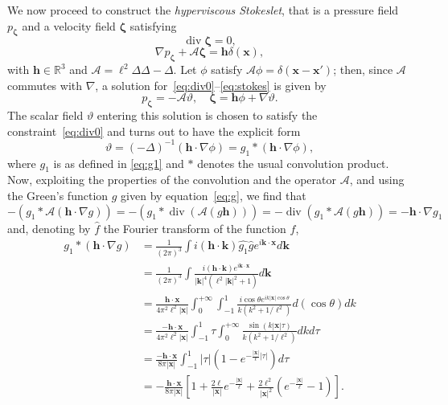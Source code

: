 \documentclass[final]{amsart}
\theoremstyle{definition}
\theoremstyle{definition}
\theoremstyle{remark}
\begin{document}
We now proceed to construct the {\em hyperviscous Stokeslet}, that is a
pressure field ${p_{\boldsymbol{\zeta}}}$ and a velocity field ${\boldsymbol{\zeta}}$ satisfying
\begin{equation}\label{eq:div0}
{\operatorname{\mathrm{div}}}{\boldsymbol{\zeta}}=0,
\end{equation}
\begin{equation}\label{eq:stokes}
\nabla{p_{\boldsymbol{\zeta}}}+\mathcal A{\boldsymbol{\zeta}} ={\boldsymbol h}\delta({\boldsymbol x}),
\end{equation}
with ${\boldsymbol h}\in{\mathbb R}^3$ and $\mathcal A=\ell^2{\Delta}{\Delta} - {\Delta}$.
Let $\phi$ satisfy $\mathcal A\phi=\delta({\boldsymbol x}-{\boldsymbol x}')$; then, since
$\mathcal A$ commutes with $\nabla$, a solution
for~\eqref{eq:div0}--\eqref{eq:stokes} is given by
\[
{p_{\boldsymbol{\zeta}}}=-\mathcal A\vartheta,\quad
{\boldsymbol{\zeta}}={\boldsymbol h}\phi+\nabla\vartheta.
\]
The scalar field $\vartheta$ entering this solution is chosen to satisfy the constraint~\eqref{eq:div0} and turns out to have the explicit form
\[
\vartheta=(-{\Delta})^{-1}({\boldsymbol h}\cdot\nabla \phi)=g_1*({\boldsymbol h}\cdot\nabla\phi),
\]
where $g_1$ is as defined in \eqref{eq:g1} and $*$ denotes the usual
convolution product. Now, exploiting the properties of the
convolution and the operator $\mathcal A$, and using the Green's
function $g$ given by equation~\eqref{eq:g}, we find that
\[
-(g_1*\mathcal A({\boldsymbol h}\cdot\nabla g))=-(g_1*{\operatorname{\mathrm{div}}}(\mathcal A(g{\boldsymbol h})))=-{\operatorname{\mathrm{div}}}(g_1*\mathcal A(g{\boldsymbol h}))=-{\boldsymbol h}\cdot\nabla g_1
\]
and, denoting by ${\widehat{{f}}}$ the Fourier transform of the function $f$,
\begin{align*}
g_1*({\boldsymbol h}\cdot\nabla g)&\mbox{}=\frac{1}{(2\pi)^3}\int i({\boldsymbol h}\cdot{\boldsymbol k}){\widehat{{g_1}}}{\widehat{{g}}}e^{i{\boldsymbol k}\cdot{\boldsymbol x}}d{\boldsymbol k}\\
&\mbox{}
=\frac{1}{(2\pi)^3}\int\frac{i({\boldsymbol h}\cdot{\boldsymbol k})e^{i{\boldsymbol k}\cdot{\boldsymbol x}}}{ |{\boldsymbol k}|^4(\ell^2|{\boldsymbol k}|^2+1)}d{\boldsymbol k}\\
&\mbox{}
=\frac{{\boldsymbol h}\cdot{\boldsymbol x}}{4\pi^2\ell^2|{\boldsymbol x}|}\int_0^{+\infty}\int_{-1}^{1}\frac{i\cos\theta e^{ik|{\boldsymbol x}|\cos\theta}}{k(k^2+1/\ell^2)}d(\cos\theta)dk\\
&\mbox{}=\frac{-{\boldsymbol h}\cdot{\boldsymbol x}}{4\pi^2\ell^2|{\boldsymbol x}|}\int_{-1}^{1}\tau\int_0^{+\infty}\frac{\sin(k|{\boldsymbol x}|\tau)}{k(k^2+1/\ell^2)} dk d\tau\\
&\mbox{}
=\frac{-{\boldsymbol h}\cdot{\boldsymbol x}}{8\pi |{\boldsymbol x}|}\int_{-1}^{1}|\tau|\left(1-e^{-\frac{|{\boldsymbol x}|}{\ell}|\tau|} \right)d\tau\\
&\mbox{}=-\frac{{\boldsymbol h}\cdot{\boldsymbol x}}{8\pi |{\boldsymbol x}|}\left[1+\frac{2\ell}{|{\boldsymbol x}|}e^{-\frac{|{\boldsymbol x}|}{\ell}}+\frac{2\ell^2}{|{\boldsymbol x}|^2}\left(e^{-\frac{|{\boldsymbol x}|}{\ell}}-1\right)\right]
.
\end{align*}
\end{document}
